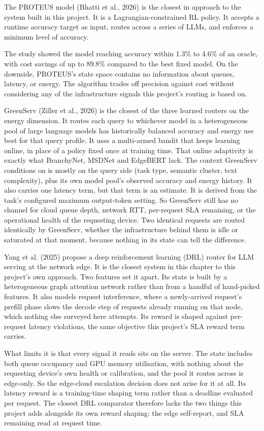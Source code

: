 The PROTEUS model (Bhatti et al., 2026) is the closest in approach to
the system built in this project. It is a Lagrangian-constrained RL
policy. It accepts a runtime accuracy target as input, routes across a
series of LLMs, and enforces a minimum level of accuracy.

The study showed the model reaching accuracy within 1.3\% to 4.6\% of
an oracle, with cost savings of up to 89.8\% compared to the best fixed
model. On the downside, PROTEUS's state space contains no information about
queues, latency, or energy. The algorithm trades off precision against
cost without considering any of the infrastructure signals this
project's routing is based on.

GreenServ (Ziller et al., 2026) is the closest of the three learned
routers on the energy dimension. It routes each query to whichever
model in a heterogeneous pool of large language models has historically
balanced accuracy and energy use best for that query profile. It uses a
multi-armed bandit that keeps learning online, in place of a policy
fixed once at training time. That online adaptivity is exactly what
BranchyNet, MSDNet and EdgeBERT lack. The context GreenServ conditions
on is mostly on the query side (task type, semantic cluster, text
complexity), plus its own model pool's observed accuracy and energy
history. It also carries one latency term, but that term is an
estimate. It is derived from the task's
configured maximum output-token setting. So GreenServ still has no channel for cloud queue
depth, network RTT, per-request SLA remaining, or the operational
health of the requesting device. Two identical requests are routed
identically by GreenServ, whether the infrastructure behind them is
idle or saturated at that moment, because nothing in its state can tell
the difference.

Yang et al. (2025) propose a deep reinforcement learning (DRL) router
for LLM serving at the network edge. It is the closest system in this
chapter to this project's own approach. Two features set it apart.
Its state is built by a heterogeneous graph attention network rather
than from a handful of hand-picked features. It also models request
interference, where a newly-arrived request's prefill phase slows the
decode step of requests already running on that node, which nothing
else surveyed here attempts. Its reward is shaped against per-request
latency violations, the same objective this project's SLA reward term
carries.

What limits it is that every signal it reads sits on the server. The
state includes both queue occupancy and GPU memory utilisation, with nothing about
the requesting device's own health or calibration, and the pool it
routes across is edge-only. So the edge-cloud escalation decision does
not arise for it at all. Its latency reward is a training-time shaping
term rather than a deadline evaluated per request. The closest DRL
comparator therefore lacks the two things this project adds alongside
its own reward shaping: the edge self-report, and SLA remaining read at
request time.

